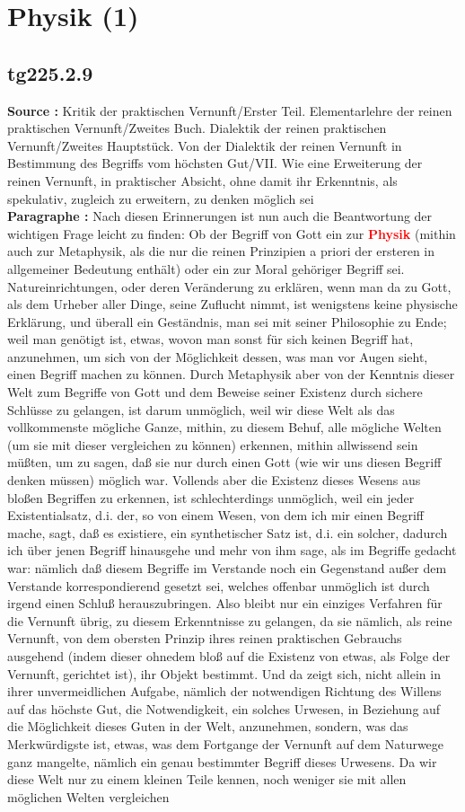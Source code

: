 \documentclass[a4paper,12pt,twoside]{book}
\newcommand{\match}[1]{\textcolor{red}{\textbf{#1}}}
\newcommand{\unnumberedsection}[1]{
	\section*{#1}
	\addcontentsline{toc}{section}{#1}
	\markright{#1}
}
\begin{document}
	\unnumberedsection{Physik (1)} 
	\subsection*{tg225.2.9} 
	\textbf{Source : }Kritik der praktischen Vernunft/Erster Teil. Elementarlehre der reinen praktischen Vernunft/Zweites Buch. Dialektik der reinen praktischen Vernunft/Zweites Hauptstück. Von der Dialektik der reinen Vernunft in Bestimmung des Begriffs vom höchsten Gut/VII. Wie eine Erweiterung der reinen Vernunft, in praktischer Absicht, ohne damit ihr Erkenntnis, als spekulativ, zugleich zu erweitern, zu denken möglich sei\\  
	
	\noindent\textbf{Paragraphe : }Nach diesen Erinnerungen ist nun auch die Beantwortung der wichtigen Frage leicht zu finden: Ob der Begriff von Gott ein zur \match{Physik} (mithin auch zur Metaphysik, als die nur die reinen Prinzipien a priori der ersteren in allgemeiner  Bedeutung enthält) oder ein zur Moral gehöriger Begriff sei. Natureinrichtungen, oder deren Veränderung zu erklären, wenn man da zu Gott, als dem Urheber aller Dinge, seine Zuflucht nimmt, ist wenigstens keine physische Erklärung, und überall ein Geständnis, man sei mit seiner Philosophie zu Ende; weil man genötigt ist, etwas, wovon man sonst für sich keinen Begriff hat, anzunehmen, um sich von der Möglichkeit dessen, was man vor Augen sieht, einen Begriff machen zu können. Durch Metaphysik aber von der Kenntnis dieser Welt zum Begriffe von Gott und dem Beweise seiner Existenz durch sichere Schlüsse zu gelangen, ist darum unmöglich, weil wir diese Welt als das vollkommenste mögliche Ganze, mithin, zu diesem Behuf, alle mögliche Welten (um sie mit dieser vergleichen zu können) erkennen, mithin allwissend sein müßten, um zu sagen, daß sie nur durch einen Gott (wie wir uns diesen Begriff denken müssen) möglich war. Vollends aber die Existenz dieses Wesens aus bloßen Begriffen zu erkennen, ist schlechterdings unmöglich, weil ein jeder Existentialsatz, d.i. der, so von einem Wesen, von dem ich mir einen Begriff mache, sagt, daß es existiere, ein synthetischer Satz ist, d.i. ein solcher, dadurch ich über jenen Begriff hinausgehe und mehr von ihm sage, als im Begriffe gedacht war: nämlich daß diesem Begriffe im Verstande noch ein Gegenstand außer dem Verstande korrespondierend gesetzt sei, welches offenbar unmöglich ist durch irgend einen Schluß herauszubringen. Also bleibt nur ein einziges Verfahren für die Vernunft übrig, zu diesem Erkenntnisse zu gelangen, da sie nämlich, als reine Vernunft, von dem obersten Prinzip ihres reinen praktischen Gebrauchs ausgehend (indem dieser ohnedem bloß auf die Existenz von etwas, als Folge der Vernunft, gerichtet ist), ihr Objekt bestimmt. Und da zeigt sich, nicht allein in ihrer unvermeidlichen Aufgabe, nämlich der notwendigen Richtung des Willens auf das höchste Gut, die Notwendigkeit, ein solches Urwesen, in Beziehung auf die Möglichkeit dieses Guten in der Welt, anzunehmen, sondern, was das Merkwürdigste ist, etwas, was dem Fortgange der Vernunft auf dem Naturwege ganz  mangelte, nämlich ein genau bestimmter Begriff dieses Urwesens. Da wir diese Welt nur zu einem kleinen Teile kennen, noch weniger sie mit allen möglichen Welten vergleichen 
\end{document}
